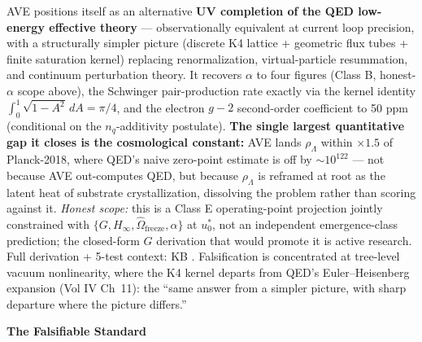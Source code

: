 \noindent AVE positions itself as an alternative \textbf{UV completion of the QED low-energy effective theory} --- observationally equivalent at current loop precision, with a structurally simpler picture (discrete K4 lattice + geometric flux tubes + finite saturation kernel) replacing renormalization, virtual-particle resummation, and continuum perturbation theory. It recovers $\alpha$ to four figures (Class B, honest-$\alpha$ scope above), the Schwinger pair-production rate exactly via the kernel identity $\int_0^1 \sqrt{1-A^2}\,dA = \pi/4$, and the electron $g{-}2$ second-order coefficient to 50 ppm (conditional on the $n_q$-additivity postulate). \textbf{The single largest quantitative gap it closes is the cosmological constant:} AVE lands $\rho_\Lambda$ within $\times 1.5$ of Planck-2018, where QED's naive zero-point estimate is off by $\sim 10^{122}$ --- not because AVE out-computes QED, but because $\rho_\Lambda$ is reframed at root as the latent heat of substrate crystallization, dissolving the problem rather than scoring against it. \emph{Honest scope:} this is a Class E operating-point projection jointly constrained with $\{G, H_\infty, \hat\Omega_{\text{freeze}}, \alpha\}$ at $u_0^*$, not an independent emergence-class prediction; the closed-form $G$ derivation that would promote it is active research. Full derivation + 5-test context: KB . Falsification is concentrated at tree-level vacuum nonlinearity, where the K4 kernel departs from QED's Euler--Heisenberg expansion (Vol IV Ch~11): the ``same answer from a simpler picture, with sharp departure where the picture differs.''

\vspace{1.5em}
\noindent \textbf{The Falsifiable Standard}

